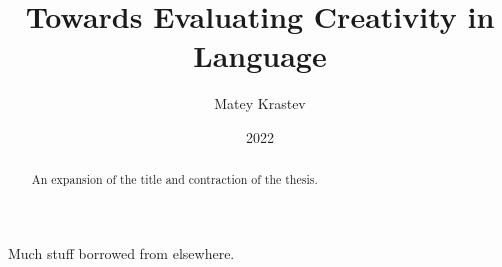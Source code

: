 \documentclass[bsc]{abdnthesis}
\title{Towards Evaluating Creativity in Language}
\author{Matey Krastev}
\date{2022}
\begin{document}
 

\maketitle
\makedeclaration

\begin{abstract}
  An expansion of the title and contraction of the thesis.
\end{abstract}

\begin{acknowledgements}
  Much stuff borrowed from elsewhere.
\end{acknowledgements}



\tableofcontents

\printglossary[type=\acronymtype]



% 






% 

\appendix
% 


\end{document}
